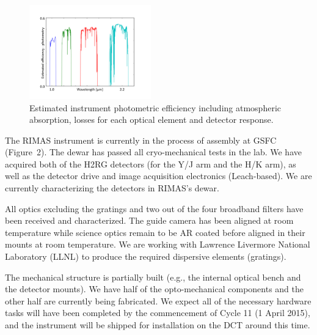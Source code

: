 \documentclass[letterpaper,11pt]{article}
\begin{document}
\begin{figure}[tp!]
\begin{center}
\includegraphics[width=0.47\textwidth]{figures/slide5.pdf}
\vspace{-0.9cm}
\end{center}
\caption{\footnotesize
{ Estimated instrument photometric efficiency including atmospheric absorption, losses for each optical element and detector response. }}
\label{fig2}
\vspace{-0.4cm}
\end{figure}


\smallskip

The RIMAS instrument is currently in the process of assembly at GSFC (Figure~2).
The dewar has passed all cryo-mechanical tests in the lab.  We have acquired both of the H2RG detectors (for the Y/J 
arm and the H/K arm), as well as the detector drive and image acquisition electronics
(Leach-based).  We are currently characterizing the detectors in RIMAS's dewar.

All optics excluding the gratings and two out of the four broadband filters have been received and characterized.  
The guide camera has been aligned at room temperature while science optics remain to be AR 
coated before aligned in their mounts at room temperature. We are working with Lawrence Livermore 
National Laboratory (LLNL) to produce the required dispersive elements (gratings).  

The mechanical structure is partially built (e.g., the internal optical bench and 
the detector mounts).  We have half of the opto-mechanical components and the other half 
are currently being fabricated.   We expect all of the necessary 
hardware tasks will have been completed by the commencement of Cycle 11 (1 April 2015), 
and the instrument will be shipped for installation on the DCT around this time.
\end{document}
